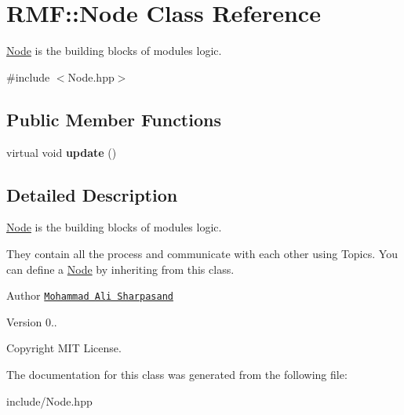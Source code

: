 \hypertarget{classRMF_1_1Node}{}\section{R\+MF\+:\+:Node Class Reference}
\label{classRMF_1_1Node}


\hyperlink{classRMF_1_1Node}{Node} is the building blocks of modules logic.  




{\ttfamily \#include $<$Node.\+hpp$>$}

\subsection*{Public Member Functions}
\begin{DoxyCompactItemize}
\item 
virtual void {\bfseries update} ()\hypertarget{classRMF_1_1Node_a26d161c468575d913c9c62d7297035b9}{}\label{classRMF_1_1Node_a26d161c468575d913c9c62d7297035b9}

\end{DoxyCompactItemize}


\subsection{Detailed Description}
\hyperlink{classRMF_1_1Node}{Node} is the building blocks of modules logic. 

They contain all the process and communicate with each other using Topics. You can define a \hyperlink{classRMF_1_1Node}{Node} by inheriting from this class.

\begin{DoxyAuthor}{Author}
\href{mailto:a.sharpasand@mrl-spl.ir}{\tt Mohammad Ali Sharpasand} 
\end{DoxyAuthor}
\begin{DoxyVersion}{Version}
0.. 
\end{DoxyVersion}
\begin{DoxyCopyright}{Copyright}
M\+IT License. 
\end{DoxyCopyright}


The documentation for this class was generated from the following file\+:\begin{DoxyCompactItemize}
\item 
include/Node.\+hpp\end{DoxyCompactItemize}
